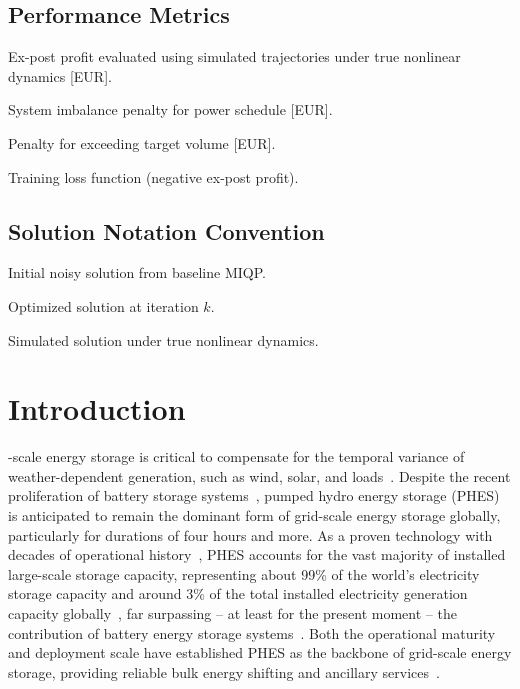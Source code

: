\documentclass[journal]{IEEEtran}
\begin{document}
\subsection*{Performance Metrics}
\begin{IEEEdescription}
\item[$\Pi$] Ex-post profit evaluated using simulated trajectories under true nonlinear dynamics [EUR].
\item[$\text{SI}$] System imbalance penalty for power schedule [EUR].
\item[$\text{Vol}$] Penalty for exceeding target volume [EUR].
\item[$\mathcal{L}(\theta)$] Training loss function (negative ex-post profit).
\end{IEEEdescription}

\subsection*{Solution Notation Convention}
\begin{IEEEdescription}
\item[$\bar{\mathbf{x}}$] Initial noisy solution from baseline MIQP.
\item[$\hat{\mathbf{x}}^{(k)}$] Optimized solution at iteration $k$.
\item[$\tilde{\mathbf{x}}$] Simulated solution under true nonlinear dynamics.
\end{IEEEdescription}

\section{Introduction} 
\label{sec:introduction}

-scale energy storage is critical to compensate for the temporal variance of weather-dependent generation, such as wind, solar, and loads~\cite{golshani2018coordination}. Despite the recent proliferation of battery storage systems~\cite{wang2016review}, pumped hydro energy storage (PHES) is anticipated to remain the dominant form of grid-scale energy storage globally, particularly for durations of four hours and more. As a proven technology with decades of operational history~\cite{REHMAN2015586}, PHES accounts for the vast majority of installed large-scale storage capacity, representing about 99\% of the world’s electricity storage capacity and around 3\% of the total installed electricity generation capacity globally~\cite{rastler2010electricity}, far surpassing -- at least for the present moment -- the contribution of battery energy storage systems~\cite{blakers2021review}. Both the operational maturity and deployment scale have established PHES as the backbone of grid-scale energy storage, providing reliable bulk energy shifting and ancillary services~\cite{hunt2020existing}.
\end{document}
